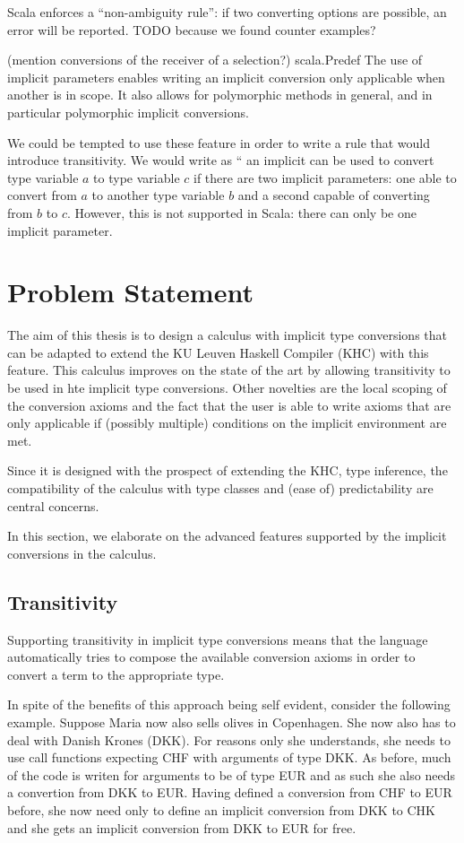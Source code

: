 Scala enforces a ``non-ambiguity rule'': if two converting options are possible, an error will be reported. TODO because we found counter examples?

(mention conversions of the receiver of a selection?)
scala.Predef
The use of implicit parameters enables writing an implicit conversion only applicable when another is in scope. It also allows for polymorphic methods in general, and in particular polymorphic implicit conversions.

We could be tempted to use these feature in order to write a rule that would introduce transitivity. We would write as `` an implicit can be used to convert type variable $a$ to type variable $c$ if there are two implicit parameters: one able to convert from $a$ to another type variable $b$ and a second capable of converting from $b$ to $c$. However, this is not supported in Scala: there can only be one implicit parameter.
\section{Problem Statement}
\label{problem}
The aim of this thesis is to design a calculus with implicit type conversions that can be adapted to extend the KU Leuven Haskell Compiler (KHC) with this feature. This calculus improves on the state of the art by allowing transitivity to be used in hte implicit type conversions. Other novelties are the local scoping of the conversion axioms and the fact that the user is able to write axioms that are only applicable if (possibly multiple) conditions on the implicit environment are met. 

Since it is designed with the prospect of extending the KHC, type inference, the compatibility of the calculus with type classes and (ease of) predictability are central concerns.

In this section, we elaborate on the advanced features supported by the implicit conversions in the calculus.

\subsection{Transitivity}
Supporting transitivity in implicit type conversions means that the language automatically tries to compose the available conversion axioms in order to convert a term to the appropriate type.

In spite of the benefits of this approach being self evident, consider the following example. Suppose Maria now also sells olives in Copenhagen. She now also has to deal with Danish Krones (DKK). For reasons only she understands, she needs to use call functions expecting CHF with arguments of type DKK. As before, much of the code is writen for arguments to be of type EUR and as such she also needs a convertion from DKK to EUR. Having defined a conversion from CHF to EUR before, she now need only to define an implicit conversion from DKK to CHK and she gets an implicit conversion from DKK to EUR for free. 

